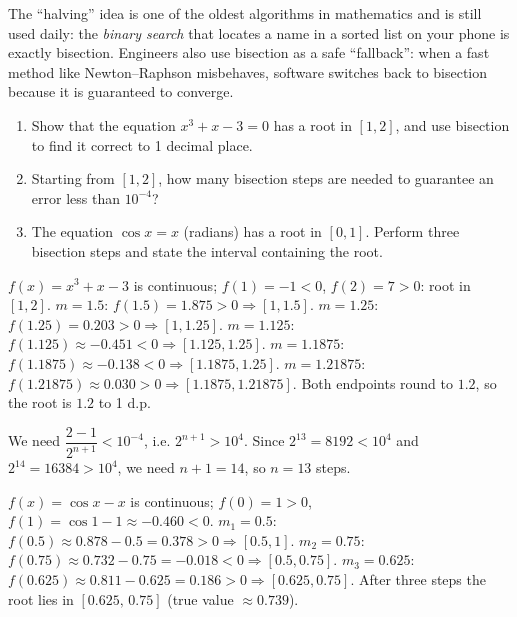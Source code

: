 \documentclass[11pt]{article}
\begin{document}
\begin{savaistu}
The ``halving'' idea is one of the oldest algorithms in mathematics and is still used daily: the \emph{binary search} that locates a name in a sorted list on your phone is exactly bisection. Engineers also use bisection as a safe ``fallback'': when a fast method like Newton--Raphson misbehaves, software switches back to bisection because it is guaranteed to converge.
\end{savaistu}

\begin{exercice}[Practice]
\begin{enumerate}
\item Show that the equation $x^3+x-3=0$ has a root in $[1,2]$, and use bisection to find it correct to 1 decimal place.
\item Starting from $[1,2]$, how many bisection steps are needed to guarantee an error less than $10^{-4}$?
\item The equation $\cos x = x$ (radians) has a root in $[0,1]$. Perform three bisection steps and state the interval containing the root.
\end{enumerate}
\end{exercice}

\begin{corrige}[Exercise 1]
$f(x)=x^3+x-3$ is continuous; $f(1)=-1<0$, $f(2)=7>0$: root in $[1,2]$.
$m=1.5$: $f(1.5)=1.875>0 \Rightarrow [1,1.5]$. $m=1.25$: $f(1.25)=0.203>0 \Rightarrow [1,1.25]$. $m=1.125$: $f(1.125)\approx-0.451<0 \Rightarrow [1.125,1.25]$. $m=1.1875$: $f(1.1875)\approx-0.138<0 \Rightarrow [1.1875,1.25]$. $m=1.21875$: $f(1.21875)\approx0.030>0 \Rightarrow [1.1875,1.21875]$. Both endpoints round to $1.2$, so the root is $1.2$ to 1 d.p.
\end{corrige}

\begin{corrige}[Exercise 2]
We need $\dfrac{2-1}{2^{n+1}}<10^{-4}$, i.e. $2^{n+1}>10^{4}$. Since $2^{13}=8192<10^4$ and $2^{14}=16384>10^4$, we need $n+1=14$, so $n=13$ steps.
\end{corrige}

\begin{corrige}[Exercise 3]
$f(x)=\cos x - x$ is continuous; $f(0)=1>0$, $f(1)=\cos1-1\approx-0.460<0$.
$m_1=0.5$: $f(0.5)\approx0.878-0.5=0.378>0 \Rightarrow [0.5,1]$.
$m_2=0.75$: $f(0.75)\approx0.732-0.75=-0.018<0 \Rightarrow [0.5,0.75]$.
$m_3=0.625$: $f(0.625)\approx0.811-0.625=0.186>0 \Rightarrow [0.625,0.75]$.
After three steps the root lies in $[0.625,\,0.75]$ (true value $\approx 0.739$).
\end{corrige}
\end{document}
